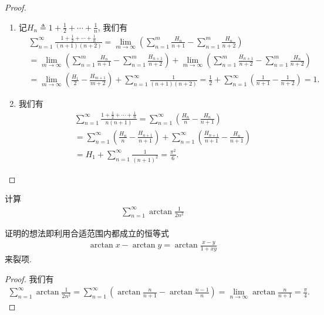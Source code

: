 \documentclass[../../main.tex]{subfiles}%
\begin{document}
\begin{proof}
\begin{enumerate}
\item 记$H_n \triangleq 1 + \frac{1}{2} + \cdots + \frac{1}{n}$, 我们有
\begin{align*}
&\sum_{n=1}^{\infty} \frac{1 + \frac{1}{2} + \cdots + \frac{1}{n}}{(n + 1)(n + 2)} = \lim_{m \to \infty} \left( \sum_{n=1}^{m} \frac{H_n}{n + 1} - \sum_{n=1}^{m} \frac{H_n}{n + 2} \right) \\
&= \lim_{m \to \infty} \left( \sum_{n=1}^{m} \frac{H_n}{n + 1} - \sum_{n=1}^{m} \frac{H_{n + 1}}{n + 2} \right) + \lim_{m \to \infty} \left( \sum_{n=1}^{m} \frac{H_{n + 1}}{n + 2} - \sum_{n=1}^{m} \frac{H_n}{n + 2} \right) \\
&= \lim_{m \to \infty} \left( \frac{H_1}{2} - \frac{H_{m + 1}}{m + 2} \right) + \sum_{n=1}^{\infty} \frac{1}{(n + 1)(n + 2)} = \frac{1}{2} + \sum_{n=1}^{\infty} \left( \frac{1}{n + 1} - \frac{1}{n + 2} \right) = 1.
\end{align*}

\item 我们有
\begin{align*}
&\sum_{n=1}^{\infty} \frac{1 + \frac{1}{2} + \cdots + \frac{1}{n}}{n(n + 1)} = \sum_{n=1}^{\infty} \left( \frac{H_n}{n} - \frac{H_n}{n + 1} \right) \\
&= \sum_{n=1}^{\infty} \left( \frac{H_n}{n} - \frac{H_{n + 1}}{n + 1} \right) + \sum_{n=1}^{\infty} \left( \frac{H_{n + 1}}{n + 1} - \frac{H_n}{n + 1} \right) \\
&= H_1 + \sum_{n=1}^{\infty} \frac{1}{(n + 1)^2} = \frac{\pi^2}{6}.
\end{align*}
\end{enumerate}
\end{proof}

\begin{example}
计算
\begin{align*}
\sum_{n=1}^{\infty} \arctan \frac{1}{2n^2}
\end{align*}
\end{example}
\begin{note}
证明的想法即利用合适范围内都成立的恒等式
\begin{align*}
\arctan x - \arctan y = \arctan \frac{x - y}{1 + xy}
\end{align*}
来裂项.
\end{note}
\begin{proof}
我们有
\begin{align*}
\sum_{n=1}^{\infty} \arctan \frac{1}{2n^2} = \sum_{n=1}^{\infty} \left( \arctan \frac{n}{n + 1} - \arctan \frac{n - 1}{n} \right) = \lim_{n \to \infty} \arctan \frac{n}{n + 1} = \frac{\pi}{4}.
\end{align*}
\end{proof}
\end{document}
